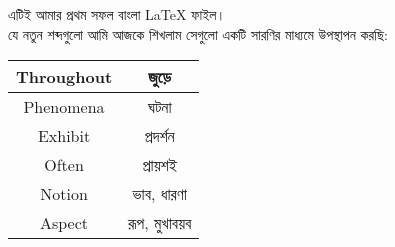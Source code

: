 \documentclass[16 pt]{article}
\begin{document}
এটিই আমার প্রথম সফল বাংলা \LaTeX{} ফাইল। \\
যে নতুন শব্দগুলো আমি আজকে শিখলাম সেগুলো একটি সারণির মাধ্যমে উপস্থাপন করছি: \\
\begin{tabular}{| c | c |}
	\hline 
	Throughout & জুড়ে \\ 
	\hline 
	Phenomena & ঘটনা \\ 
	\hline 
	Exhibit & প্রদর্শন \\
	\hline 
	Often & প্রায়শই \\ 
	\hline 
	Notion & ভাব, ধারণা \\ 
	\hline
	Aspect & রূপ, মুখাবয়ব \\
	\hline
\end{tabular}
	
\end{document}
